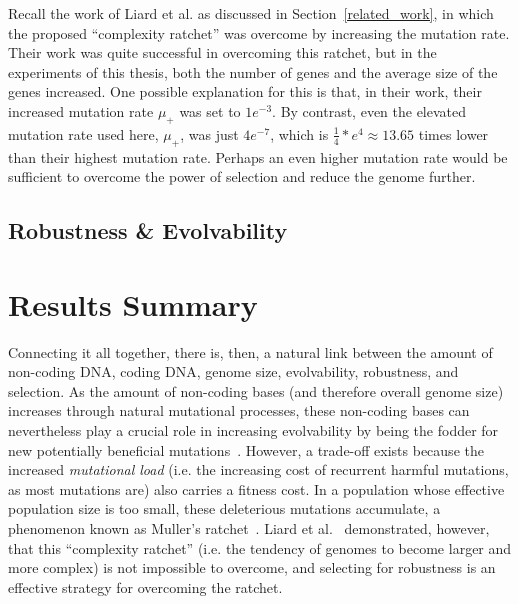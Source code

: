 Recall the work of Liard et al.\cite{Liard.2018} as discussed in Section~\ref{related_work}, in which the proposed ``complexity ratchet'' was overcome by increasing the mutation rate. Their work was quite successful in overcoming this ratchet, but in the experiments of this thesis, both the number of genes and the average size of the genes increased. One possible explanation for this is that, in their work, their increased mutation rate $\mu_+$ was set to $1e^{-3}$.  By contrast, even the elevated mutation rate used here, $\mu_+$, was just $4e^{-7}$, which is $\frac{1}{4}*e^4 \approx 13.65$ times lower than their highest mutation rate. Perhaps an even higher mutation rate would be sufficient to overcome the power of selection and reduce the genome further. 

\subsection{Robustness \& Evolvability}
%


\section{Results Summary}
Connecting it all together, there is, then, a natural link between the amount of non-coding DNA, coding DNA, genome size, evolvability, robustness, and selection. As the amount of non-coding bases (and therefore overall genome size) increases through natural mutational processes, these non-coding bases can nevertheless play a crucial role in increasing evolvability by being the fodder for new potentially beneficial mutations~\cite{Knibbe2007}. However, a trade-off exists because the increased \textit{mutational load} (i.e. the increasing cost of recurrent harmful mutations, as most mutations are) also carries a fitness cost. In a population whose effective population size is too small, these deleterious mutations accumulate, a phenomenon known as Muller's ratchet~\cite{MullersRatchet}. Liard et al.~\cite{Liard.2018} demonstrated, however, that this ``complexity ratchet'' (i.e. the tendency of genomes to become larger and more complex) is not impossible to overcome, and selecting for robustness is an effective strategy for overcoming the ratchet. 

